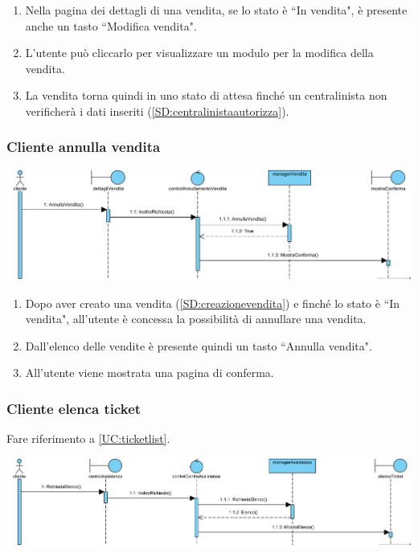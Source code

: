 \documentclass[12pt,a4paper]{article}
\begin{document}
\begin{enumerate}
\item Nella pagina dei dettagli di una vendita, se lo stato è ``In vendita", è presente anche un tasto ``Modifica vendita".
\item L'utente può cliccarlo per visualizzare un modulo per la modifica della vendita. 
\item La vendita torna quindi in uno stato di attesa finché un centralinista non verificherà i dati inseriti (\ref{SD:centralinistaautorizza}).
\end{enumerate}

\subsubsection{Cliente annulla vendita}
\label{SD:annullavendita}

\begin{center}
\includegraphics[width=\textwidth]{SequenceDiagram/ClienteVenditaAnnulla}
\end{center}

\begin{enumerate}
\item Dopo aver creato una vendita (\ref{SD:creazionevendita}) e finché lo stato è ``In vendita", all'utente è concessa la possibilità di annullare una vendita.
\item Dall'elenco delle vendite è presente quindi un tasto ``Annulla vendita".
\item All'utente viene mostrata una pagina di conferma.
\end{enumerate}

\newpage

\subsubsection{Cliente elenca ticket}
\label{SD:elencoticket}
Fare riferimento a \ref{UC:ticketlist}. \\

\begin{center}
\includegraphics[width=\textwidth]{SequenceDiagram/ClienteTicketElenco}
\end{center}
\end{document}

